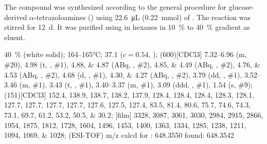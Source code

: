The compound was synthesized according to the general procedure for glucose-derived $\alpha$-tetrazoloamines () using \SI{22.6}{\micro\liter} (\SI{0.22}{\milli\mol}) of .
The reaction was stirred for \SI{12}{\day}.
It was purified using  in hexanes in \SI{10}{\percent} to \SI{40}{\percent} gradient as eluent.
\begin{fullexp}
	 \SI{40}{\percent} (white solid); 
	 \numrange{164}{165}\si{\celsius}; 
	\data{[$\alpha^{23}_D$]~$=$} \num{37.1} ($c = 0.54$, ); 
	\NMR(600)[CDCl3] \numrange{7.32}{6.96} (m, \#{20}), \num{4.98} (t, , \#{1}), \numlist{4.88;4.87} (ABq, , \#{2}), \numlist{4.85;4.49} (ABq, , \#{2}), \numlist{4.76;4.53} (ABq, , \#{2}), \num{4.68} (d, , \#{1}), \numlist{4.30;4.27} (ABq, , \#{2}), \num{3.79} (dd, , \#{1}), \numrange{3.52}{3.46} (m, \#{1}), \num{3.43} (t, , \#{1}), \numrange{3.40}{3.37} (m, \#{1}), \num{3.09} (ddd, , \#{1}), \num{1.54} (s, \#{9}); 
	(151)[CDCl3] \numlist{152.4; 138.9; 138.7; 138.2; 137.9; 128.4; 128.4; 128.4; 128.3; 128.1; 127.7; 127.7; 127.7; 127.7; 127.6; 127.5; 127.4; 83.5; 81.4; 80.6; 75.7; 74.6; 74.3; 73.1; 69.7; 61.2; 53.2; 50.5; 30.2}; 
	[film] \numlist{3328; 3087; 3061; 3030; 2984; 2915; 2866; 1954; 1875; 1812; 1728; 1604; 1496; 1453; 1400; 1363; 1334; 1285; 1238; 1211; 1094; 1069; 1028}; 
	 (ESI-TOF) m/z calcd for : \num{648.3550} found: \num{648.3542}
\end{fullexp}

